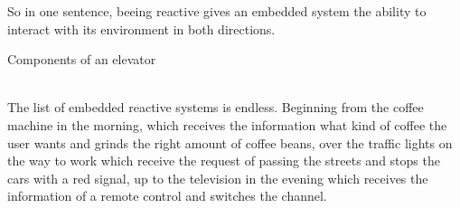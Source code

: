 {\noindent So in one sentence, beeing reactive gives an embedded system the ability to interact with its environment in both directions.

\begin{floatingfigure}[r]{72mm}
\centering
\mbox{}
\caption{Components of an elevator \cite[][]{ElectricalKnowHow2013}}
\label{fig:elevator}
\end{floatingfigure}

\noindent\\ The list of embedded reactive systems is endless. Beginning from the coffee machine in the morning, which receives the information what kind of coffee the user wants and grinds the right amount of coffee beans, over the traffic lights on the way to work which receive the request of passing the streets and stops the cars with a red signal, up to the television in the evening which receives the information of a remote control and switches the channel. 

}
